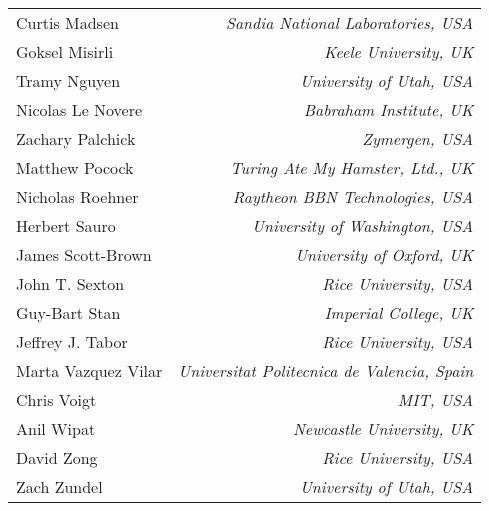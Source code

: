 \documentclass[finalspec]{sbmlpkgspec}
\newcommand{\tododeferred}[1]{\todo[color=cyan, inline]{#1}}
\begin{document}
{\begin{small}
\begin{tabular}{l>{\hspace*{15pt}}r}
Curtis Madsen & \emph{Sandia National Laboratories, USA}\\
Goksel Misirli & \emph{Keele University, UK}\\
Tramy Nguyen & \emph{University of Utah, USA}\\
Nicolas Le Novere & \emph{Babraham Institute, UK}\\
Zachary Palchick & \emph{Zymergen, USA}\\
Matthew Pocock & \emph{Turing Ate My Hamster, Ltd., UK}\\
Nicholas Roehner & \emph{Raytheon BBN Technologies, USA}\\
Herbert Sauro & \emph{University of Washington, USA}\\
James Scott-Brown & \emph{University of Oxford, UK}\\
John T. Sexton & \emph{Rice University, USA}\\
Guy-Bart Stan & \emph{Imperial College, UK}\\
Jeffrey J. Tabor & \emph{Rice University, USA}\\
Marta Vazquez Vilar & \emph{Universitat Politecnica de Valencia, Spain}\\
Chris Voigt & \emph{MIT, USA}\\
Anil Wipat & \emph{Newcastle University, UK}\\
David Zong & \emph{Rice University, USA}\\
Zach Zundel & \emph{University of Utah, USA}\\
\end{tabular}
\end{small}
}



\maketitlepage

\maketableofcontents












\appendix
\appendixlabels







\newpage
\label{s:bibliography}

\end{document}
